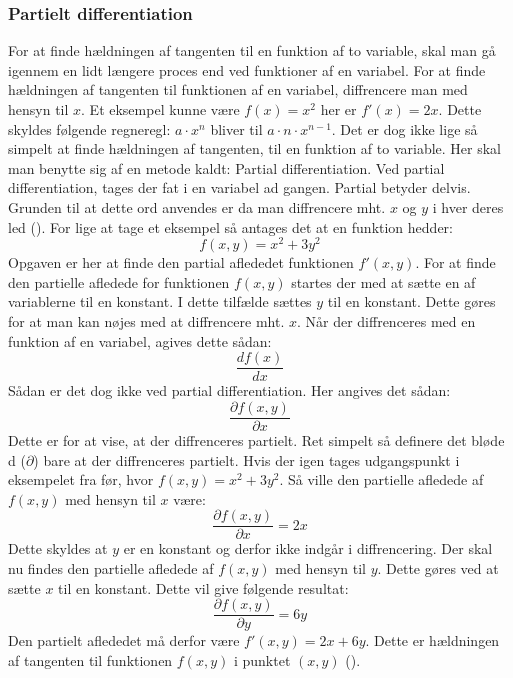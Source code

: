 
\subsubsection{Partielt differentiation}\label{sec:PartieltDifferentiation}
For at finde hældningen af tangenten til en funktion af to variable, skal man gå igennem en lidt længere proces end ved funktioner af en variabel. For at finde hældningen af tangenten til funktionen af en variabel, diffrencere man med hensyn til $x$. Et eksempel kunne være $f(x) = x^2$ her er $f'(x) = 2x$. Dette skyldes følgende regneregl: $a \cdot x^n$ bliver til $a \cdot n \cdot x^{n-1}$. Det er dog ikke lige så simpelt at finde hældningen af tangenten, til en funktion af to variable. Her skal man benytte sig af en metode kaldt: Partial differentiation. Ved partial differentiation, tages der fat i en variabel ad gangen. Partial betyder delvis. Grunden til at dette ord anvendes er da man diffrencere mht. $x$ og $y$ i hver deres led (\cite[4]{Larsen2016}). For lige at tage et eksempel så antages det at en funktion hedder: 
\begin{equation}f(x,y) = x^2 + 3y^2\end{equation}
Opgaven er her at finde den partial aflededet funktionen $f'(x,y)$. For at finde den partielle afledede for funktionen $f(x,y)$ startes der med at sætte en af variablerne til en konstant. I dette tilfælde sættes $y$ til en konstant. Dette gøres for at man kan nøjes med at diffrencere mht. $x$. Når der diffrenceres med en funktion af en variabel, agives dette sådan: \begin{equation}\frac{d f(x)}{d x}\end{equation} Sådan er det dog ikke ved partial differentiation. Her angives det sådan: \begin{equation}\frac{\partial f(x,y)}{\partial x}\end{equation} Dette er for at vise, at der diffrenceres partielt. Ret simpelt så definere det bløde d ($\partial$) bare at der diffrenceres partielt. Hvis der igen tages udgangspunkt i eksempelet fra før, hvor $f(x,y) = x^2 + 3y^2$. Så ville den partielle afledede af $f(x,y)$ med hensyn til $x$ være: \begin{equation}\frac{\partial f(x,y)}{\partial x} = 2x\end{equation}
Dette skyldes at $y$ er en konstant og derfor ikke indgår i diffrencering. Der skal nu findes den partielle afledede af $f(x,y)$ med hensyn til $y$. Dette gøres ved at sætte $x$ til en konstant. Dette vil give følgende resultat: \begin{equation}\frac{\partial f(x,y)}{\partial y} = 6y\end{equation} Den partielt aflededet må derfor være $f'(x,y) = 2x + 6y$. Dette er hældningen af tangenten til funktionen $f(x,y)$ i punktet $(x,y)$ (\cite{Carstensen2024}).


